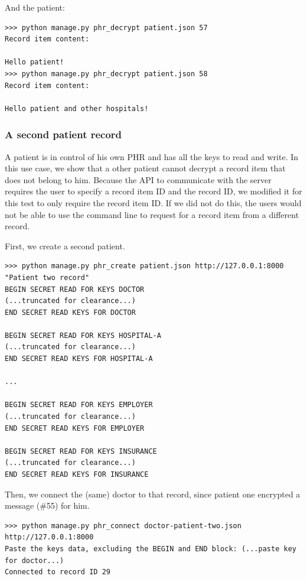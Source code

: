 \documentclass[a4paper]{article}
\begin{document}
			And the patient:

			\begin{lstlisting}
>>> python manage.py phr_decrypt patient.json 57
Record item content:

Hello patient!
>>> python manage.py phr_decrypt patient.json 58
Record item content:

Hello patient and other hospitals!
			\end{lstlisting}
		
		\subsubsection{A second patient record}\label{sec:usecase_8}
			A patient is in control of his own PHR and has all the keys to read and write. In this use case, we show that a other patient cannot decrypt a record item that does not belong to him. Because the API to communicate with the server requires the user to specify a record item ID and the record ID, we modified it for this test to only require the record item ID. If we did not do this, the users would not be able to use the command line to request for a record item from a different record.
			
			First, we create a second patient.
			
			\begin{lstlisting}
>>> python manage.py phr_create patient.json http://127.0.0.1:8000 "Patient two record"
BEGIN SECRET READ FOR KEYS DOCTOR
(...truncated for clearance...)
END SECRET READ KEYS FOR DOCTOR

BEGIN SECRET READ FOR KEYS HOSPITAL-A
(...truncated for clearance...)
END SECRET READ KEYS FOR HOSPITAL-A

...

BEGIN SECRET READ FOR KEYS EMPLOYER
(...truncated for clearance...)
END SECRET READ KEYS FOR EMPLOYER

BEGIN SECRET READ FOR KEYS INSURANCE
(...truncated for clearance...)
END SECRET READ KEYS FOR INSURANCE
			\end{lstlisting}
			
			Then, we connect the (same) doctor to that record, since patient one encrypted a message (\#55) for him.
			
			\begin{lstlisting}
>>> python manage.py phr_connect doctor-patient-two.json http://127.0.0.1:8000
Paste the keys data, excluding the BEGIN and END block: (...paste key for doctor...)
Connected to record ID 29
			\end{lstlisting}
			
\end{document}
